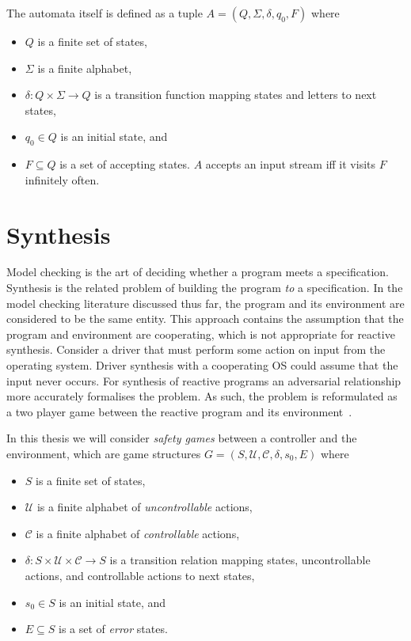 The automata itself is defined as a tuple $A = (Q, \Sigma, \delta, q_0, F)$ where

\begin{itemize} 
    \item $Q$ is a finite set of states,
    \item $\Sigma$ is a finite alphabet,
    \item $\delta : Q \times \Sigma \to Q$ is a transition function mapping states and letters to next states,
    \item $q_0 \in Q$ is an initial state, and
    \item $F \subseteq Q$ is a set of accepting states. $A$ accepts an input stream iff it visits $F$ infinitely often.
\end{itemize}

\section{Synthesis}

Model checking is the art of deciding whether a program meets a specification. Synthesis is the related problem of building the program \emph{to} a specification. In the model checking literature discussed thus far, the program and its environment are considered to be the same entity. This approach contains the assumption that the program and environment are cooperating, which is not appropriate for reactive synthesis. Consider a driver that must perform some action on input from the operating system. Driver synthesis with a cooperating OS could assume that the input never occurs. For synthesis of reactive programs an adversarial relationship more accurately formalises the problem. As such, the problem is reformulated as a two player game between the reactive program and its environment~\cite{Pnueli89}.

In this thesis we will consider \emph{safety games} between a controller and the environment, which are game structures $G = (S, \mathcal{U}, \mathcal{C}, \delta, s_0, E)$ where

\begin{itemize}
    \item $S$ is a finite set of states,
    \item $\mathcal{U}$ is a finite alphabet of \emph{uncontrollable} actions,
    \item $\mathcal{C}$ is a finite alphabet of \emph{controllable} actions,
    \item $\delta : S \times \mathcal{U} \times \mathcal{C} \to S$ is a transition relation mapping states, uncontrollable actions, and controllable actions to next states,
    \item $s_0 \in S$ is an initial state, and
    \item $E \subseteq S$ is a set of \emph{error} states.
\end{itemize}

